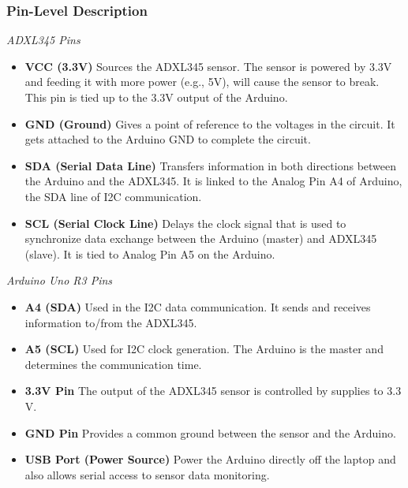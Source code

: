 \documentclass[conference]{IEEEtran}
\begin{document}
\subsubsection{Pin-Level Description}

\textit{ADXL345 Pins}

\begin{itemize}[leftmargin=*,noitemsep]
    \item \textbf{VCC (3.3V)}  
    Sources the ADXL345 sensor. The sensor is powered by 3.3V and feeding it with 
    more power (e.g., 5V), will cause the sensor to break. This pin is tied up to the 
    3.3V output of the Arduino.

    \item \textbf{GND (Ground)}  
    Gives a point of reference to the voltages in the circuit. It gets attached to the 
    Arduino GND to complete the circuit.

    \item \textbf{SDA (Serial Data Line)}  
    Transfers information in both directions between the Arduino and the ADXL345. 
    It is linked to the Analog Pin A4 of Arduino, the SDA line of I2C communication.

    \item \textbf{SCL (Serial Clock Line)}  
    Delays the clock signal that is used to synchronize data exchange between the 
    Arduino (master) and ADXL345 (slave). It is tied to Analog Pin A5 on the 
    Arduino.
\end{itemize}

\textit{Arduino Uno R3 Pins}

\begin{itemize}[leftmargin=*,noitemsep]
    \item \textbf{A4 (SDA)}  
    Used in the I2C data communication. It sends and receives information to/from 
    the ADXL345.

    \item \textbf{A5 (SCL)}  
    Used for I2C clock generation. The Arduino is the master and determines the 
    communication time.

    \item \textbf{3.3V Pin}  
    The output of the ADXL345 sensor is controlled by supplies to 3.3 V.

    \item \textbf{GND Pin}  
    Provides a common ground between the sensor and the Arduino.

    \item \textbf{USB Port (Power Source)}  
    Power the Arduino directly off the laptop and also allows serial access to sensor 
    data monitoring.
\end{itemize}
\end{document}
